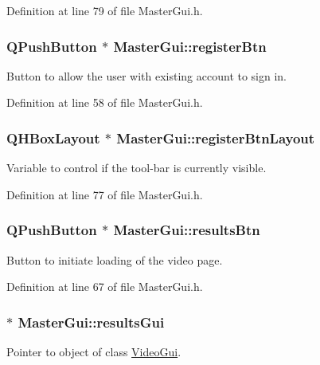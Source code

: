 Definition at line 79 of file Master\-Gui.\-h.

\hypertarget{class_master_gui_a3ebebfb6aa22009a1850e639a05d7ea1}{
\subsubsection[{register\-Btn}]{\setlength{\rightskip}{0pt plus 5cm}Q\-Push\-Button $\ast$ Master\-Gui\-::register\-Btn\hspace{0.3cm}{\ttfamily [private]}}}\label{class_master_gui_a3ebebfb6aa22009a1850e639a05d7ea1}
Button to allow the user with existing account to sign in. 

Definition at line 58 of file Master\-Gui.\-h.

\hypertarget{class_master_gui_a4b34838acdd8c752614c7f17e64bac75}{
\subsubsection[{register\-Btn\-Layout}]{\setlength{\rightskip}{0pt plus 5cm}Q\-H\-Box\-Layout $\ast$ Master\-Gui\-::register\-Btn\-Layout\hspace{0.3cm}{\ttfamily [private]}}}\label{class_master_gui_a4b34838acdd8c752614c7f17e64bac75}
Variable to control if the tool-\/bar is currently visible. 

Definition at line 77 of file Master\-Gui.\-h.

\hypertarget{class_master_gui_a09730feb7f21ecd4f3b279056afdb429}{
\subsubsection[{results\-Btn}]{\setlength{\rightskip}{0pt plus 5cm}Q\-Push\-Button $\ast$ Master\-Gui\-::results\-Btn\hspace{0.3cm}{\ttfamily [private]}}}\label{class_master_gui_a09730feb7f21ecd4f3b279056afdb429}
Button to initiate loading of the video page. 

Definition at line 67 of file Master\-Gui.\-h.

\hypertarget{class_master_gui_a8e08570b318c97eefa367445490bc017}{
\subsubsection[{results\-Gui}]{ $\ast$ Master\-Gui\-::results\-Gui\hspace{0.3cm}{\ttfamily [private]}}}\label{class_master_gui_a8e08570b318c97eefa367445490bc017}
Pointer to object of class \hyperlink{class_video_gui}{Video\-Gui}. 

